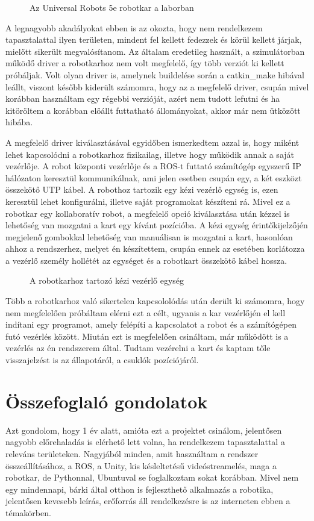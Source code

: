 \documentclass[11pt,a4paper,oneside]{article}
\newcommand{\insertfig}[4]{
	\vspace*{2mm}
	\begin{figure}[#4]
		\center
		\resizebox{#3}{!}{\texttt{[image: images/\#1]}}
		\parbox{0.8\textwidth}{\vspace*{4mm}\caption{{#2}}\small\label{fig:#1}}
	\end{figure}
	\vspace*{-2\parskip}
}
\begin{document}
\insertfig{robotkar-labor}{Az Universal Robots 5e robotkar a laborban}{10cm}{h!}

A legnagyobb akadályokat ebben is az okozta, hogy nem rendelkezem tapasztalattal ilyen területen, mindent fel kellett fedezzek és körül kellett járjak, mielőtt sikerült megvalósítanom. Az általam eredetileg használt, a szimulátorban működő driver a robotkarhoz nem volt megfelelő, így több verziót ki kellett próbáljak. Volt olyan driver is, amelynek buildelése során a catkin\_make hibával leállt, viszont később kiderült számomra, hogy az a megfelelő driver, csupán mivel korábban használtam egy régebbi verzióját, azért nem tudott lefutni és ha kitöröltem a korábban előállt futtatható állományokat, akkor már nem ütközött hibába.

A megfelelő driver kiválasztásával egyidőben ismerkedtem azzal is, hogy miként lehet kapcsolódni a robotkarhoz fizikailag, illetve hogy működik annak a saját vezérlője. A robot központi vezérlője és a ROS-t futtató számítógép egyszerű IP hálózaton keresztül kommunikálnak, ami jelen esetben csupán egy, a két eszközt összekötő UTP kábel. A robothoz tartozik egy kézi vezérlő egység is, ezen keresztül lehet konfigurálni, illetve saját programokat készíteni rá. Mivel ez a robotkar egy kollaboratív robot, a megfelelő opció kiválasztása után kézzel is lehetőség van mozgatni a kart egy kívánt pozícióba. A kézi egység érintőkijelzőjén megjelenő gombokkal lehetőség van manuálisan is mozgatni a kart, hasonlóan ahhoz a rendszerhez, melyet én készítettem, csupán ennek az esetében korlátozza a vezérlő személy hollétét az egységet és a robotkart összekötő kábel hossza.

\insertfig{robot-vezerlo}{A robotkarhoz tartozó kézi vezérlő egység}{8cm}{h!}

Több a robotkarhoz való sikertelen kapcsololódás után derült ki számomra, hogy nem megfelelően próbáltam elérni ezt a célt, ugyanis a kar vezérlőjén el kell indítani egy programot, amely felépíti a kapcsolatot a robot és a számítógépen futó vezérlés között. Miután ezt is megfelelően csináltam, már működött is a vezérlés az én rendszerem által. Tudtam vezérelni a kart és kaptam tőle visszajelzést is az állapotáról, a csuklók pozíciójáról.


\newpage
\section{Összefoglaló gondolatok}

Azt gondolom, hogy 1 év alatt, amióta ezt a projektet csinálom, jelentősen nagyobb előrehaladás is elérhető lett volna, ha rendelkezem tapasztalattal a releváns területeken. Nagyjából minden, amit használtam a rendszer összeállításához, a ROS, a Unity, kis késleltetésű videóstreamelés, maga a robotkar, de Pythonnal, Ubuntuval se foglalkoztam sokat korábban. Mivel nem egy mindennapi, bárki által otthon is fejleszthető alkalmazás a robotika, jelentősen kevesebb leírás, erőforrás áll rendelkezésre is az interneten ebben a témakörben.
\end{document}
